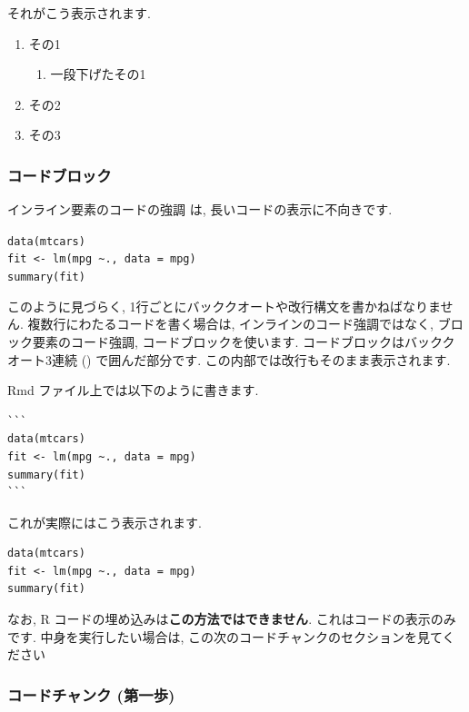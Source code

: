 \documentclass[
]{ltjsarticle}
\providecommand{\tightlist}{%
  \setlength{\itemsep}{0pt}\setlength{\parskip}{0pt}}
\begin{document}
それがこう表示されます.

\begin{enumerate}
\def\labelenumi{\arabic{enumi}.}
\tightlist
\item
  その1

  \begin{enumerate}
  \def\labelenumii{\arabic{enumii}.}
  \tightlist
  \item
    一段下げたその1
  \end{enumerate}
\item
  その2
\item
  その3
\end{enumerate}

\hypertarget{ux30b3ux30fcux30c9ux30d6ux30edux30c3ux30af}{%
\subsubsection{コードブロック}\label{ux30b3ux30fcux30c9ux30d6ux30edux30c3ux30af}}

インライン要素のコードの強調 \texttt{\textasciigrave{}} は, 長いコードの表示に不向きです.

\texttt{data(mtcars)}~\\
\texttt{fit\ \textless{}-\ lm(mpg\ \textasciitilde{}.,\ data\ =\ mpg)}~\\
\texttt{summary(fit)}

このように見づらく, 1行ごとにバッククオートや改行構文を書かねばなりません. 複数行にわたるコードを書く場合は, インラインのコード強調ではなく, ブロック要素のコード強調, コードブロックを使います. コードブロックはバッククオート3連続 (\texttt{\textasciigrave{}\textasciigrave{}\textasciigrave{}}) で囲んだ部分です. この内部では改行もそのまま表示されます.

Rmd ファイル上では以下のように書きます.

\begin{verbatim}
```
data(mtcars)
fit <- lm(mpg ~., data = mpg)
summary(fit)
```
\end{verbatim}

これが実際にはこう表示されます.

\begin{verbatim}
data(mtcars)
fit <- lm(mpg ~., data = mpg)
summary(fit)
\end{verbatim}

なお, R コードの埋め込みは\textbf{この方法ではできません}. これはコードの表示のみです. 中身を実行したい場合は, この次のコードチャンクのセクションを見てください

\hypertarget{code-chunk-init}{%
\subsubsection{コードチャンク (第一歩)}\label{code-chunk-init}}
\end{document}
